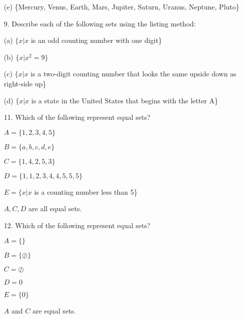 \documentclass{article}
\begin{document}
\begin{itemize}
    (e) \{Mercury, Venus, Earth, Mars, Jupiter, Saturn, Uranus, Neptune, Pluto\}\\
    
    \item[9.] Describe each of the following sets using the listing method:
    
    (a) $\{x|x$ is an odd counting number with one digit\}\\
    
    (b) $\{x|x^2 = 9\}$\\
    
    (c) $\{x|x$ is a two-digit counting number that looks the same upside down as right-side up\}\\
    
    (d) $\{x|x$ is a state in the United States that begins with the letter A\}\\
    
    \item[11.] Which of the following represent equal sets?
    
    $A = \{1, 2, 3, 4, 5\}$
    
    $B = \{a, b, c, d, e\}$
    
    $C = \{1, 4, 2, 5, 3\}$
    
    $D = \{1, 1, 2, 3, 4, 4, 5, 5, 5\}$
    
    $E = \{x|x$ is a counting number less than 5\}
    
    {\color{blue}$A, C, D$ are all equal sets.}
    
    \item[12.] Which of the following represent equal sets?
    
    $A = \{\}$
    
    $B = \{\oslash\}$
    
    $C = \oslash$
    
    $D = 0$
    
    $E = \{0\}$
    
    {\color{blue}$A$ and $C$ are equal sets.}
    

\end{itemize}
\end{document}
